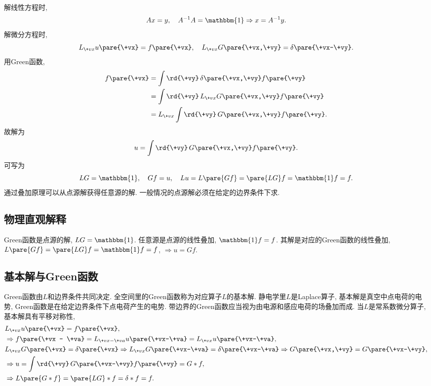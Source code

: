 \documentclass[hidelinks]{ctexart}
\begin{document}
\newpoint{}解线性方程时,
\[ Ax = y,\quad A^{-1}A = \mathbbm{1} \Rightarrow x = A^{-1}y. \]
\newpoint{}解微分方程时,
\[ L_{\+vx}u\pare{\+vx} = f\pare{\+vx},\quad L_{\+vx}G\pare{\+vx,\+vy} = \delta\pare{\+vx-\+vy}. \]
\newpoint{}用Green函数,
\begin{align*}
    f\pare{\+vx} &= \int \rd{\+vy}\, \delta\pare{\+vx,\+vy} f\pare{\+vy} \\
    &= \int \rd{\+vy}\, L_{\+vx}G\pare{\+vx,\+vy}f\pare{\+vy} \\
    &= L_{\+vx}\int \rd{\+vy}\,G\pare{\+vx,\+vy}f\pare{\+vy}.
\end{align*}
故解为
\[ u = \int \rd{\+vy}\, G\pare{\+vx,\+vy}f\pare{\+vy}. \]
\newpoint{}可写为
\[ LG = \mathbbm{1},\quad Gf = u,\quad Lu = L\pare{Gf} = \pare{LG}f = \mathbbm{1}f = f. \]
\newpoint{}通过叠加原理可以从点源解获得任意源的解.
\newpoint{}一般情况的点源解必须在给定的边界条件下求.


\subsection{物理直观解释} %
\label{sub:物理直观解释}

\newpoint{}Green函数是点源的解, $LG = \mathbbm{1}$.
\newpoint{}任意源是点源的线性叠加, $\mathbbm{1} f = f$.
\newpoint{}其解是对应的Green函数的线性叠加, $L\pare{Gf} = \pare{LG}f = \mathbbm{1}f = f$, $\Rightarrow u = Gf$.


\subsection{基本解与Green函数} %
\label{sub:基本解与green函数}

\newpoint{}Green函数由$L$和边界条件共同决定.
\newpoint{}全空间里的Green函数称为对应算子$L$的基本解.
\newpoint{}静电学里$L$是Laplace算子, 基本解是真空中点电荷的电势, Green函数是在给定边界条件下点电荷产生的电势.
\newpoint{}带边界的Green函数应当视为由电源和感应电荷的场叠加而成.
\newpoint{}当$L$是常系数微分算子, 基本解具有平移对称性,
\begin{align*}
    & L_{\+vx}u\pare{\+vx} = f\pare{\+vx}, \\
    & \Rightarrow f\pare{\+vx - \+va} = L_{\+vx-\+va}u\pare{\+vx-\+va} = L_{\+vx}u\pare{\+vx-\+va}, \\
    & L_{\+vx}G\pare{\+vx} = \delta\pare{\+vx} \Rightarrow L_{\+vx}G\pare{\+vx-\+va} = \delta\pare{\+vx-\+va} \Rightarrow G\pare{\+vx,\+vy} = G\pare{\+vx-\+vy}, \\
    & \Rightarrow u = \int \rd{\+vy}\, G\pare{\+vx-\+vy}f\pare{\+vy} = G*f, \\
    & \Rightarrow L\pare{G*f} = \pare{LG}*f = \delta*f = f.
\end{align*}
\end{document}
